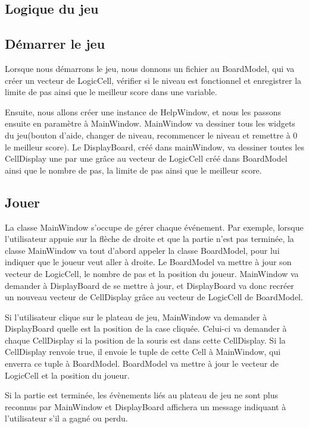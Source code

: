 \documentclass[utf8]{article}
\begin{document}
\begin{large}
\section{Logique du jeu}
\subsection{Démarrer le jeu}
\indent
\par

Lorsque nous démarrons le jeu, nous donnons un fichier au BoardModel, qui va
créer un vecteur de LogicCell, vérifier si le niveau est fonctionnel et
enregistrer la limite de pas ainsi que le meilleur score dans une variable.
\par
Ensuite, nous allons créer une instance de HelpWindow, et nous les passons
ensuite en paramètre à MainWindow. MainWindow va dessiner tous les widgets du
jeu(bouton d'aide, changer de niveau, recommencer le niveau et remettre à 0 le
meilleur score). Le DisplayBoard, créé dans mainWindow, va dessiner toutes les
CellDisplay une par une grâce au vecteur de LogicCell créé dans BoardModel ainsi
que le nombre de pas, la limite de pas ainsi que le meilleur score.


\par
\subsection{Jouer}
\indent
\par
La classe MainWindow s'occupe de gérer chaque événement. Par exemple, lorsque
l'utilisateur appuie sur la flèche de droite et que la partie n'est pas
terminée, la classe MainWindow va tout d'abord appeler la classe BoardModel,
pour lui indiquer que le joueur veut aller à droite. Le BoardModel va mettre à
jour son vecteur de LogicCell, le nombre de pas et la position du joueur.
MainWindow va demander à DisplayBoard de se mettre à jour, et DisplayBoard va
donc recréer un nouveau vecteur de CellDisplay grâce au vecteur de LogicCell de
BoardModel.
\par
Si l'utilisateur clique sur le plateau de jeu, MainWindow va demander à
DisplayBoard quelle est la position de la case cliquée. Celui-ci va demander à
chaque CellDisplay si la position de la souris est dans cette CellDisplay. Si la
CellDisplay renvoie true, il envoie le tuple de cette Cell à MainWindow, qui
enverra ce tuple à BoardModel. BoardModel va mettre à jour le vecteur de
LogicCell et la position du joueur.
\par
Si la partie est terminée, les évènements liés au plateau de jeu ne sont plus
reconnus par MainWindow et DisplayBoard affichera un message indiquant à
l'utilisateur s'il a gagné ou perdu.
\par


\end{large}
\end{document}
